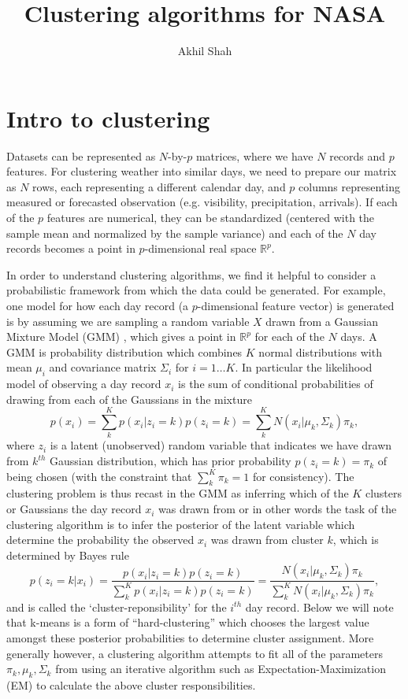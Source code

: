 \documentclass[11pt]{amsart}
\title{Clustering algorithms for NASA}
\author{Akhil Shah}
\begin{document}
\maketitle
\section{Intro to clustering}
Datasets can be represented as $N$-by-$p$ matrices, where we have $N$ records and $p$ features.  For clustering weather into similar days, we need to prepare our matrix as $N$ rows, each representing a different calendar day, and $p$ columns representing measured or forecasted observation (e.g. visibility, precipitation, arrivals).  If each of the $p$ features are numerical, they can be standardized (centered with the sample mean and normalized by the sample variance) and each of the $N$ day records becomes a point in $p$-dimensional real space $\mathbb{R}^p$.  

In order to understand clustering algorithms, we find it helpful to consider a probabilistic framework from which the data could be generated.  For example, one model for how each day record (a $p$-dimensional feature vector) is generated is by assuming we are sampling a random variable $X$ drawn from a Gaussian Mixture Model (GMM) \cite{murphy}, which gives a point in  $\mathbb{R}^p$ for each of the $N$ days.  A GMM is probability distribution which combines $K$ normal distributions with mean $\mu_i$ and covariance matrix $\Sigma_i$ for $i=1\ldots K$.  In particular the likelihood model of observing a day record $x_i$ is the sum of conditional probabilities of drawing from each of the Gaussians in the mixture
\begin{equation}
p(x_i) = \sum_k^K p(x_i|z_i=k) p(z_i=k)=  \sum_k^KN(x_i|\mu_k,\Sigma_k)\pi_k,
\end{equation}
where $z_i$ is a latent (unobserved) random variable that indicates we have drawn from $k^{th}$ Gaussian distribution, which has prior probability $p(z_i=k)=\pi_k$ of being chosen (with the constraint that $\sum_k^K\pi_k=1$ for consistency).  The clustering problem is thus recast in the GMM as inferring which of the $K$ clusters or Gaussians the day record $x_i$ was drawn from or in other words the task of the clustering algorithm is to infer the posterior of the latent variable which determine the probability the observed $x_i$ was drawn from cluster $k$, which is determined by Bayes rule
\begin{equation}
p(z_i=k|x_i) = \frac{p(x_i|z_i=k)p(z_i=k)}{\sum_k^K p(x_i|z_i=k)p(z_i=k)}=\frac{ N(x_i|\mu_k,\Sigma_k)\pi_k}{\sum_k^KN(x_i|\mu_k,\Sigma_k)\pi_k},
\end{equation}
and is called the `cluster-reponsibility' \cite{murphy} for the $i^{th}$ day record.  Below we will note that k-means is a form of ``hard-clustering'' which chooses the largest value amongst these posterior probabilities to determine cluster assignment.  More generally however, a clustering algorithm attempts to fit all of the parameters {$\pi_k,\mu_k,\Sigma_k$} from using an iterative algorithm such as Expectation-Maximization (EM) \cite{murphy}\cite{lange1999numerical} to calculate the above cluster responsibilities.  
\end{document}
